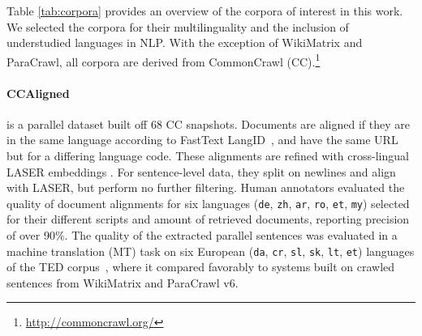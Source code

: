 Table \ref{tab:corpora} provides an overview of the corpora of interest in this work. We selected the corpora for their multilinguality and the inclusion of understudied languages in NLP. With the exception of WikiMatrix and ParaCrawl, all corpora are derived from CommonCrawl (CC).\footnote{\url{http://commoncrawl.org/}} %


\paragraph{CCAligned~\citep{el-kishky-etal-2020-ccaligned}}is a %
parallel dataset built off 68 CC snapshots. Documents are aligned if they are in the same language according to FastText LangID~\citep{joulin-etal-2016-fasttext,joulin-etal-2017-bag}, and have the same URL but for a differing language code. These alignments are refined with cross-lingual LASER embeddings \citep{artetxe-schwenk-2019-massively}. For sentence-level data, they split on newlines and align with LASER, but perform no further filtering.
Human annotators evaluated the quality of document alignments for six languages (\texttt{de}, \texttt{zh}, \texttt{ar}, \texttt{ro}, \texttt{et}, \texttt{my}) selected for their different scripts and amount of retrieved documents, reporting precision of over 90\%.
The quality of the extracted parallel sentences was evaluated in a machine translation (MT) task on six European (\texttt{da}, \texttt{cr}, \texttt{sl}, \texttt{sk}, \texttt{lt}, \texttt{et}) languages of the TED corpus~\citep{qi-etal-2018-pre}, where it compared favorably to systems built on crawled sentences from WikiMatrix and ParaCrawl v6. %

